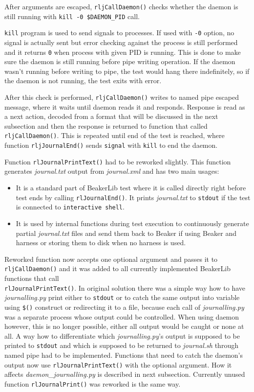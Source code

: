 After arguments are escaped, \texttt{rljCallDaemon()} checks whether the daemon is still running with \texttt{kill -0 \$DAEMON\_PID} call. 

\texttt{kill} program is used to send signals to processes. If used with \texttt{-0} option, no signal is actually sent but error checking against the process is still performed and it returns \texttt{0} when process with given PID is running\cite{man_kill}. This is done to make sure the daemon is still running before pipe writing operation.  If the daemon wasn't running before writing to pipe, the test would hang there indefinitely, so if the daemon is not running, the test exits with error.

After this check is performed, \texttt{rljCallDaemon()} writes to named pipe escaped message, where it waits until daemon reads it and responds. Response is read as a next action, decoded from a format that will be discussed in the next subsection and then the response is returned to function that called \texttt{rljCallDaemon()}. 
This is repeated until end of the test is reached, where function \texttt{rljJournalEnd()} sends \texttt{signal} with \texttt{kill} to end the daemon.


Function \texttt{rlJournalPrintText()} had to be reworked slightly. This function generates \textit{journal.txt} output from \textit{journal.xml} and has two main usages:
\begin{itemize}
\item It is a standard part of BeakerLib test where it is called directly right before test ends by calling \texttt{rlJournalEnd()}. It prints  \textit{journal.txt} to \texttt{stdout} if the test is connected to \texttt{interactive shell}.
\item It is used by internal functions during test execution to continuously generate partial \textit{journal.txt} files and send them back to Beaker if using Beaker and harness or storing them to disk when no harness is used.
\end{itemize}

Reworked function now accepts one optional argument and passes it to \texttt{rljCallDaemon()} and it was added to all currently implemented BeakerLib functions that call \\ \texttt{rlJournalPrintText()}. In original solution there was a simple way how to have \\ \textit{journalling.py} print either to \texttt{stdout} or to catch the same output into variable using  \texttt{\$()} construct or redirecting it to a file, because each call of  \textit{journalling.py} was a separate process whose output could be controlled. When using daemon however, this is no longer possible, either all output would be caught or none at all.
A way how to differentiate which \textit{journalling.py}'s output is supposed to be printed to \texttt{stdout} and which is supposed to be returned to \textit{journal.sh} through named pipe had to be implemented. Functions that need to catch the daemon's output now use  \texttt{rlJournalPrintText()} with the optional argument. How it affects \textit{daemon\_journalling.py} is described in next subsection.
Currently unused function \texttt{rlJournalPrint()} was reworked is the same way.

